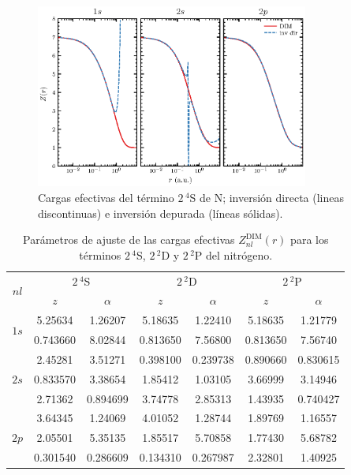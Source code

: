 \begin{figure}
\centering
\includegraphics[width=0.8\textwidth]{figures/dim/nitro_dim.eps}
\caption[Cargas efectivas DIM de nitrógeno.]
{Cargas efectivas del término $2\,^4$S de N; 
inversión directa (lineas discontinuas) 
e inversión depurada (líneas sólidas).}
\label{fig:Nzeff}
\end{figure}

\begin{table}
\centering
\begin{tabular}{|c|c|c|c|c|c|c|}
\hline
\multirow{2}{*}{$nl$} 
  & \multicolumn{2}{c}{$2\,^4$S} 
  & \multicolumn{2}{c}{$2\,^2$D} 
  & \multicolumn{2}{c}{$2\,^2$P} \\
\cline{2-7}
       & $z$ & $\alpha$ 
       & $z$ & $\alpha$ 
       & $z$ & $\alpha$ \\
\hline
\hline
\multirow{2}{*}{$1s$} & 5.25634  & 1.26207 
       & 5.18635  & 1.22410
       & 5.18635 & 1.21779  \\
\vspace*{0.09cm}
       & 0.743660 & 8.02844 
       & 0.813650 & 7.56800
       & 0.813650 & 7.56740   \\
\hline
\multirow{3}{*}{$2s$} & 2.45281  & 3.51271 
       & 0.398100 & 0.239738
       & 0.890660 & 0.830615  \\
       & 0.833570  & 3.38654 
       & 1.85412  & 1.03105
       & 3.66999  & 3.14946   \\
\vspace*{0.09cm}
       & 2.71362  & 0.894699 
       & 3.74778  & 2.85313
       & 1.43935  & 0.740427  \\
\hline
\multirow{3}{*}{$2p$}  & 3.64345  & 1.24069 
       & 4.01052  & 1.28744
       & 1.89769  & 1.16557  \\
       & 2.05501  & 5.35135 
       & 1.85517  & 5.70858 
       & 1.77430   & 5.68782 \\
       & 0.301540 & 0.286609 
       & 0.134310  & 0.267987
       & 2.32801  & 1.40925  \\
\hline
\end{tabular}
\caption[Parámetros de ajuste de cargas efectivas de nitrógeno.]
{Parámetros de ajuste de las cargas efectivas 
$Z_{nl}^{\mathrm{DIM}}(r)$ para los términos $2\,^4$S, $2\,^2$D y
$2\,^2$P del nitrógeno.}
\label{tab:parametersNitro}
\end{table}

